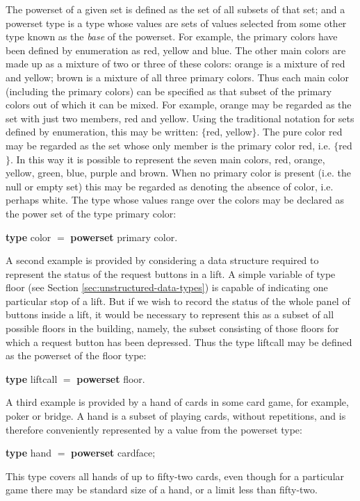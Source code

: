 The powerset of a given set is defined as the set of all subsets of that set; and a powerset type is a type whose values are sets of values selected from some other type known as the \textit{base} of the powerset. For example, the primary colors have been defined by enumeration as red, yellow and blue. The other main colors are made up as a mixture of two or three of these colors: orange is a mixture of red and yellow; brown is a mixture of all three primary colors. Thus each main color (including the primary colors) can be specified as that subset of the primary colors out of which it can be mixed. For example, orange may be regarded as the set with just two members, red and yellow. Using the traditional notation for sets defined by enumeration, this may be written: $\{$red, yellow$\}$. The pure color red may be regarded as the set whose only member is the primary color red, i.e. $\{$red$\}$. In this way it is possible to represent the seven main colors, red, orange, yellow, green, blue, purple and brown. When no primary color is present (i.e. the null or empty set) this may be regarded as denoting the absence of color, i.e. perhaps white. The type whose values range over the colors may be declared as the power set of the type primary color:

\quad \textbf{type} color $=$ \textbf{powerset} primary color.

A second example is provided by considering a data structure required to represent the status of the request buttons in a lift. A simple variable of type floor (see Section \ref{sec:unstructured-data-types}) is capable of indicating one particular stop of a lift.  But if we wish to record the status of the whole panel of buttons inside a lift, it would be necessary to represent this as a subset of all possible floors in the building, namely, the subset consisting of those floors for which a request button has been depressed. Thus the type liftcall may be defined as the powerset of the floor type:

\quad \textbf{type} liftcall $=$ \textbf{powerset} floor.

A third example is provided by a hand of cards in some card game, for example, poker or bridge. A hand is a subset of playing cards, without repetitions, and is therefore conveniently represented by a value from the powerset type:

\quad \textbf{type} hand $=$ \textbf{powerset} cardface;

\noindent
This type covers all hands of up to fifty-two cards, even though for a particular game there may be standard size of a hand, or a limit less than fifty-two.

